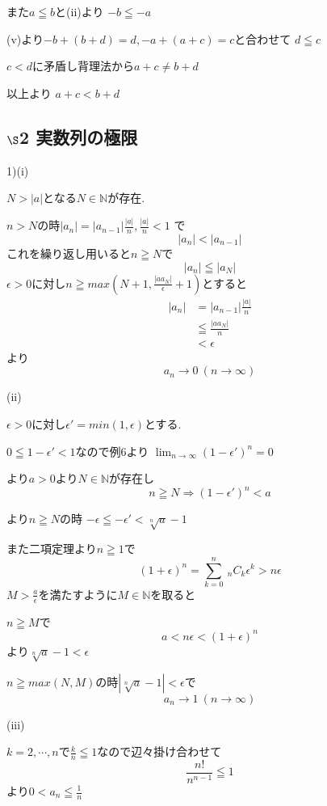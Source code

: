 \documentclass{jsarticle}
\begin{document}
       また$a\leqq b$と(ii)より
       $-b\leqq -a$
       
       (v)より$-b+(b+d)=d,-a+(a+c)=c$と合わせて
       $d\leqq c$
       
       $c<d$に矛盾し背理法から$a+c\neq b+d$
       
       
       以上より
       $a+c < b+d$
       
       
       \subsection*{$\S$2 実数列の極限}
       1)(i)
       
       $N>|a|$となる$N\in\mathbb{N}$が存在.
       
       $n>N$の時$|a_n| = |a_{n-1}|\frac{|a|}{n},\frac{|a|}{n}<1$ で
       \[|a_n| < |a_{n-1}|\]
       これを繰り返し用いると$n\geqq N$で
       \[|a_n| \leqq |a_N|\]
       $\epsilon > 0$に対し$n \geqq max(N+1,\frac{|aa_N|}{\epsilon}+1)$とすると
       \begin{align*}
       |a_n| &= |a_{n-1}|\frac{|a|}{n}\\
              &\leqq \frac{|aa_N|}{n} \\
              &< \epsilon
       \end{align*}
       より
       \[a_n\to0 \ (n\to \infty)\]
       
       
       (ii)
       
       $\epsilon > 0$に対し$\epsilon'=min(1,\epsilon)$とする.
       
       $0\leqq 1-\epsilon' < 1$なので例6より
       $\displaystyle \lim_{n\to \infty}(1-\epsilon')^n = 0$
       
       より$a>0$より$N\in\mathbb{N}$が存在し
       \[n\geqq N \Rightarrow (1-\epsilon')^n < a\]
       
       より$n\geqq N$の時
       $-\epsilon \leqq -\epsilon' < \sqrt[n]{a}-1$
       
       また二項定理より$n\geqq 1$で
       \[(1+\epsilon)^n = \sum_{k=0}^n \ _nC_k  \epsilon ^k > n\epsilon\]
       $M > \frac{a}{\epsilon}$を満たすように$M\in \mathbb{N}$を取ると
       
       $n\geqq M$で
       \[a < n\epsilon < (1+\epsilon)^n\]
       より$\sqrt[n]{a}-1 < \epsilon$
       
       $n\geqq max(N,M)$の時$|\sqrt[n]{a}-1| < \epsilon$で
       \[a_n\to1 \ (n\to \infty)\]
       
       (iii)
       
       $k=2,\cdots,n$で$\frac{k}{n}\leqq 1$なので辺々掛け合わせて
       \[\frac{n!}{n^{n-1}}\leqq 1\]
       より$0<a_n\leqq \frac{1}{n}$
       
\end{document}
